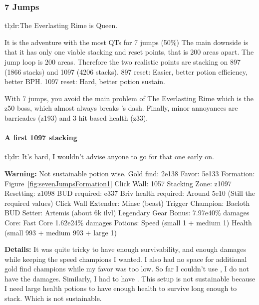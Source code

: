 \documentclass{article}
\begin{document}
\subsubsection{7 Jumps}

tl;dr:The Everlasting Rime is Queen.\newline

It is the adventure with the most QTs for 7 jumps (50\%)
The main downside is that it has only one viable stacking and reset points, that is 200 areas apart.
The jump loop is 200 areas.
Therefore the two realistic points are stacking on 897 (1866 stacks) and 1097 (4206 stacks).
897 reset: Easier, better potion efficiency, better BPH.
1097 reset: Hard, better potion sustain.

With 7 jumps, you avoid the main problem of The Everlasting Rime which is the z50 boss, which almost always breaks \shandie's dash.
Finally, minor annoyances are barricades (z193) and 3 hit based health (z33).


\paragraph{A first 1097 stacking}

tl;dr: It's hard, I wouldn't advise anyone to go for that one early on.

\textbf{Warning:} Not sustainable potion wise.
Gold find: 2e138\newline
Favor: 5e133\newline
Formation: Figure~\ref{fig:sevenJumpsFormation1}\newline
Click Wall: 1057\newline
Stacking Zone: z1097\newline
Resetting: z1098\newline
BUD required: e337\newline
Briv health required: Around 5e10 (Still the required values)\newline
Click Wall Extender: Minsc (beast)\newline
Trigger Champion: Baeloth\newline
BUD Setter: Artemis (about 6k ilvl)\newline
Legendary Gear Bonus: 7.97e40\% damages\newline
Core: Fast Core 1.62e24\% damages\newline
Potions: Speed (small 1 + medium 1) Health (small 993 + medium 993 + large 1)

\textbf{Details:}
It was quite tricky to have enough survivability, and enough damages while keeping the speed champions I wanted.
I also had no space for additional gold find champions while my favor was too low.
So far I couldn't use \widdle, I do not have the damages.
Similarly, I had to have \tyril.
This setup is not sustainable because I need large health potions to have enough health to survive long enough to stack.
Which is not sustainable.
\end{document}
